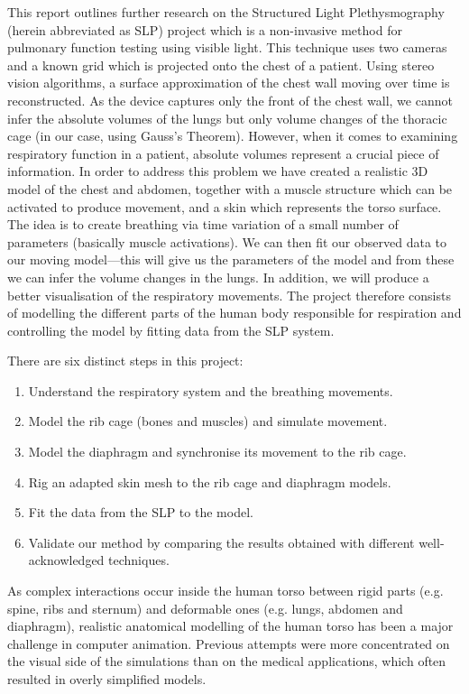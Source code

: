 This report outlines further research on the Structured Light Plethysmography (herein abbreviated as SLP) project which is a non-invasive method for pulmonary function testing using visible light. This technique uses two cameras and a known grid which is projected onto the chest of a patient. Using stereo vision algorithms, a surface approximation of the chest wall moving over time is reconstructed. As the device captures only the front of the chest wall, we cannot infer the absolute volumes of the lungs but only volume changes of the thoracic cage (in our case, using Gauss's Theorem). However, when it comes to examining respiratory function in a patient, absolute volumes represent a crucial piece of information. In order to address this problem we have created a realistic 3D model of the chest and abdomen, together with a muscle structure which can be activated to produce movement, and a skin which represents the torso surface. The idea is to create breathing via time variation of a small number of parameters (basically muscle activations). We can then fit our observed data to our moving model---this will give us the parameters of the model and from these we can infer the volume changes in the lungs. In addition, we will produce a better visualisation of the respiratory movements. The project therefore consists of modelling the different parts of the human body responsible for respiration and controlling the model by fitting data from the SLP system.

There are six distinct steps in this project:

\begin{enumerate}
	\item Understand the respiratory system and the breathing movements.
	\item Model the rib cage (bones and muscles) and simulate movement.
	\item Model the diaphragm and synchronise its movement to the rib cage.
	\item Rig an adapted skin mesh to the rib cage and diaphragm models.
	\item Fit the data from the SLP to the model.
	\item Validate our method by comparing the results obtained with different well-acknowledged techniques.
\end{enumerate}

As complex interactions occur inside the human torso between rigid parts (e.g. spine, ribs and sternum) and deformable ones (e.g. lungs, abdomen and diaphragm), realistic anatomical modelling of the human torso has been a major challenge in computer animation.
Previous attempts were more concentrated on the visual side of the simulations than on the medical applications, which often resulted in overly simplified models.

